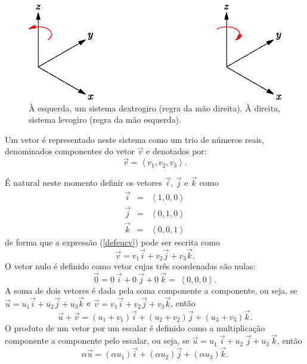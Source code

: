 \begin{figure}\begin{center}
 \includegraphics{./cap_algvet/figs/eixos_levo_destro}
      \caption{À esquerda, um sistema dextrogiro (regra da mão direita). À direita, sistema levogiro (regra da mão esquerda).}
      \label{fig:marginfig}
  \end{center}
  \end{figure}

 Um vetor é representado neste sistema como um trio de números reais, denominados componentes do vetor $\vec{v}$ e denotados por:
\begin{equation}\label{defeucv}\vec{v}=\left<v_1,v_2,v_3\right>.\end{equation}

É natural neste momento definir os vetores $\vec{i}$, $\vec{j}$ e $\vec{k}$ como
\begin{equation}\label{defijk}
\begin{array}{rcl}
\vec{i}&=&\left<1,0,0\right>\\
\vec{j}&=&\left<0,1,0\right>\\
\vec{k}&=&\left<0,0,1\right>
\end{array}
\end{equation}
de forma que a expressão (\ref{defeucv}) pode ser escrita como
\begin{equation}\label{repijk}\vec{v}=v_1  \vec{i}+v_2  \vec{j}+v_3 \vec{k}.\end{equation}
O vetor nulo é definido como vetor cujas três coordenadas são nulas:
\begin{equation}\label{defnulo}\vec{0}=0 ~\! \vec{i}+0~\!  \vec{j}+0~\!  \vec{k}= ~\!\left<0,0,0\right>.\end{equation}
A soma de dois vetores é dada pela soma componente a componente, ou seja, se $\vec{u}=u_1  \vec{i}+u_2\vec{j}+u_3 \vec{k}$ e $\vec{v}=v_1\vec{i}+v_2\vec{j}+v_3 \vec{k}$, então
\begin{equation}\label{defsoma}\vec{u}+\vec{v}= \left(u_1+v_1\right) \vec{i}+\left(u_2+v_2\right) \vec{j}+\left(u_3+v_3\right) \vec{k}.\end{equation}
O produto de um vetor por um escalar é definido como a multiplicação componente a componente pelo escalar, ou seja, se $\vec{u}=u_1~\!  \vec{i}+u_2~\!  \vec{j}+u_3 ~\! \vec{k}$, então
\begin{equation}\label{defprod}\alpha\vec{u}=(\alpha u_1)\vec{i}+(\alpha u_2)\vec{j}+(\alpha u_3) \vec{k} .\end{equation}



